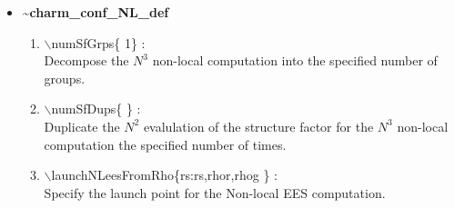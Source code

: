\begin{itemize}
\clearpage
\huge
\item[] {\bf \~{ }charm\_conf\_NL\_def}
\begin{enumerate}
  \vspace{0.15in} \Large
  \item $\backslash$numSfGrps\{ 1\} : \\    \large
  Decompose the $N^3$ non-local computation into the specified number of groups.
  \vspace{0.15in} \Large
  \item $\backslash$numSfDups\{ \} : \\    \large
  Duplicate the $N^2$ evalulation of the structure factor for the
  $N^3$ non-local computation the specified number of times.
  \vspace{0.15in} \Large
  \item $\backslash$launchNLeesFromRho\{rs:rs,rhor,rhog \} : \\  \large
  Specify the launch point for the Non-local EES computation.
\end{enumerate}


\end{itemize}
